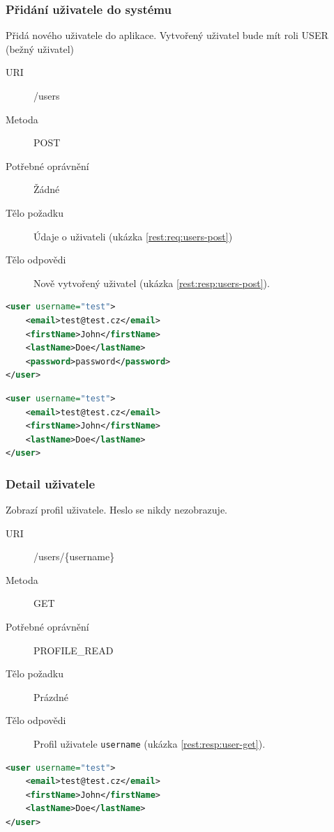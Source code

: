 \documentclass[thesis=M,czech]{FITthesis}[2014/05/6]
\begin{document}
\subsubsection{Přidání uživatele do systému}
Přidá nového uživatele do aplikace. Vytvořený uživatel bude mít roli USER (bežný uživatel)
\begin{description}
  \item[URI] /users
  \item[Metoda] POST
  \item[Potřebné oprávnění] Žádné
  \item[Tělo požadku] Údaje o uživateli (ukázka \ref{rest:req:users-post})
  \item[Tělo odpovědi] Nově vytvořený uživatel (ukázka \ref{rest:resp:users-post}).
\end{description}

\begin{lstlisting}[caption=Tělo požadavku zdroje /users (POST), label=rest:req:users-post, language=xml]
<user username="test">
    <email>test@test.cz</email>
    <firstName>John</firstName>
    <lastName>Doe</lastName>
    <password>password</password>
</user>
\end{lstlisting}  

\begin{lstlisting}[caption=Tělo odpovědi zdroje /users (POST), label=rest:resp:users-post, language=xml]
<user username="test">
    <email>test@test.cz</email>
    <firstName>John</firstName>
    <lastName>Doe</lastName>
</user>
\end{lstlisting}

\subsubsection{Detail uživatele}
Zobrazí profil uživatele. Heslo se nikdy nezobrazuje.
\begin{description}
  \item[URI] /users/\{username\}
  \item[Metoda] GET
  \item[Potřebné oprávnění] PROFILE\_READ
  \item[Tělo požadku] Prázdné
  \item[Tělo odpovědi] Profil uživatele \texttt{username} (ukázka \ref{rest:resp:user-get}).
\end{description}

\begin{lstlisting}[caption=Tělo odpovědi zdroje /users/\{username\} (GET), label=rest:resp:user-get, language=xml]
<user username="test">
    <email>test@test.cz</email>
    <firstName>John</firstName>
    <lastName>Doe</lastName>
</user>
\end{lstlisting}  
\end{document}

